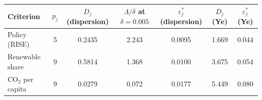 \begin{tabular}{lcccccc}
\toprule
Criterion & $p_j$ & $D_j$ (dispersion) & $\Lambda/\delta$ at $\delta{=}0.005$ & $\varepsilon^*_j$ (dispersion) & $D_j$ (Ye) & $\varepsilon^*_j$ (Ye) \\
\midrule
Policy (RISE) & 5 & 0.2435 & 2.243 & 0.0095 & 1.669 & 0.044 \\
Renewable share & 9 & 0.5814 & 1.368 & 0.0100 & 3.675 & 0.054 \\
CO$_2$ per capita & 9 & 0.0279 & 0.072 & 0.0177 & 5.449 & 0.080 \\
\bottomrule
\end{tabular}
